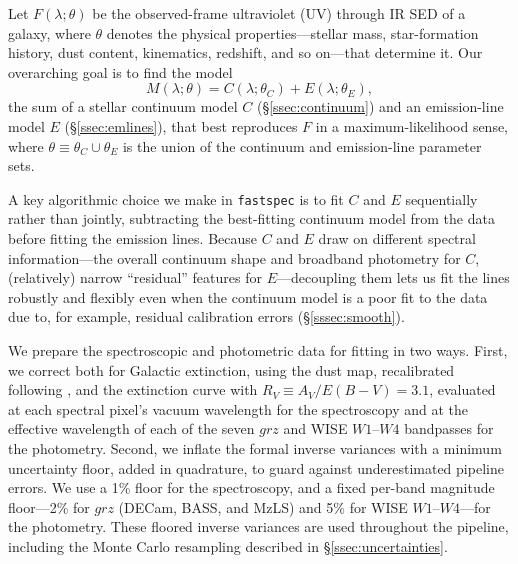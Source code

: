 \documentclass[modern,linenumbers]{aastex701}
\newcommand{\todo}[1]{{\color{red}\textbf{TODO:} #1}}
\newcommand{\fastspec}{\texttt{fastspec}}
\begin{document}
Let $F(\lambda;\theta)$ be the observed-frame ultraviolet (UV) through
IR SED of a galaxy, where $\theta$ denotes the physical
properties---stellar mass, star-formation history, dust content,
kinematics, redshift, and so on---that determine it.
Our overarching goal is to find the model
\begin{equation}
  M(\lambda;\theta) = C(\lambda;\theta_C) + E(\lambda;\theta_E),
  \label{eq:totmodel}
\end{equation}
the sum of a stellar continuum model $C$ (\S\ref{ssec:continuum}) and
an emission-line model $E$ (\S\ref{ssec:emlines}), that best
reproduces $F$ in a maximum-likelihood sense, where $\theta \equiv
\theta_C \cup \theta_E$ is the union of the continuum and
emission-line parameter sets.


%

A key algorithmic choice we make in \fastspec{} is to fit $C$ and $E$
sequentially rather than jointly, subtracting the best-fitting
continuum model from the data before fitting the emission
lines. Because $C$ and $E$ draw on different spectral
information---the overall continuum shape and broadband photometry for
$C$, (relatively) narrow ``residual'' features for $E$---decoupling
them lets us fit the lines robustly and flexibly even when the
continuum model is a poor fit to the data due to, for example,
residual calibration errors (\S\ref{sssec:smooth}).

We prepare the spectroscopic and photometric data for fitting in two
ways. First, we correct both for Galactic extinction, using the
\citet{schlegel98a} dust map, recalibrated following
\citet{schlafly11a}, and the \citet{fitzpatrick99a} extinction curve
with $R_V\equiv A_V/E(B-V)=3.1$, evaluated at each spectral pixel's
vacuum wavelength for the spectroscopy and at the effective wavelength
of each of the seven $grz$ and WISE $W1$--$W4$ bandpasses for the
photometry. Second,
we inflate the formal inverse variances with a minimum uncertainty
floor, added in quadrature, to guard against underestimated pipeline
errors. We use a 1\% floor for the spectroscopy, and a fixed per-band
magnitude floor---2\% for $grz$ (DECam, BASS, and MzLS) and 5\% for
WISE $W1$--$W4$---for the photometry. These floored inverse variances
are used throughout the pipeline, including the Monte Carlo resampling
described in \S\ref{ssec:uncertainties}.
\end{document}
